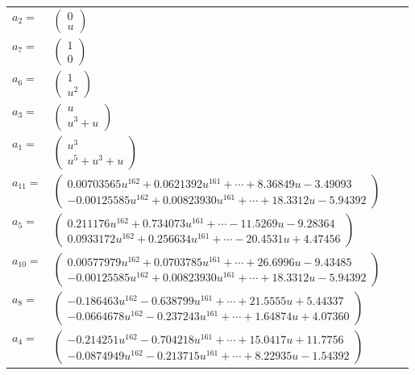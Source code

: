 \documentclass[1p]{elsarticle_modified}
\theoremstyle{definition}
\begin{document}
\begin{tabular}{m{7pt} m{180pt} m{7pt} m{180pt} }
\flushright $a_{2}=$&$\begin{pmatrix}0\\u\end{pmatrix}$ \\
\flushright $a_{7}=$&$\begin{pmatrix}1\\0\end{pmatrix}$ \\
\flushright $a_{6}=$&$\begin{pmatrix}1\\u^2\end{pmatrix}$ \\
\flushright $a_{3}=$&$\begin{pmatrix}u\\u^3+u\end{pmatrix}$ \\
\flushright $a_{1}=$&$\begin{pmatrix}u^3\\u^5+u^3+u\end{pmatrix}$ \\
\flushright $a_{11}=$&$\begin{pmatrix}0.00703565 u^{162}+0.0621392 u^{161}+\cdots+8.36849 u-3.49093\\-0.00125585 u^{162}+0.00823930 u^{161}+\cdots+18.3312 u-5.94392\end{pmatrix}$ \\
\flushright $a_{5}=$&$\begin{pmatrix}0.211176 u^{162}+0.734073 u^{161}+\cdots-11.5269 u-9.28364\\0.0933172 u^{162}+0.256634 u^{161}+\cdots-20.4531 u+4.47456\end{pmatrix}$ \\
\flushright $a_{10}=$&$\begin{pmatrix}0.00577979 u^{162}+0.0703785 u^{161}+\cdots+26.6996 u-9.43485\\-0.00125585 u^{162}+0.00823930 u^{161}+\cdots+18.3312 u-5.94392\end{pmatrix}$ \\
\flushright $a_{8}=$&$\begin{pmatrix}-0.186463 u^{162}-0.638799 u^{161}+\cdots+21.5555 u+5.44337\\-0.0664678 u^{162}-0.237243 u^{161}+\cdots+1.64874 u+4.07360\end{pmatrix}$ \\
\flushright $a_{4}=$&$\begin{pmatrix}-0.214251 u^{162}-0.704218 u^{161}+\cdots+15.0417 u+11.7756\\-0.0874949 u^{162}-0.213715 u^{161}+\cdots+8.22935 u-1.54392\end{pmatrix}$ \\

\end{tabular}
\end{document}
